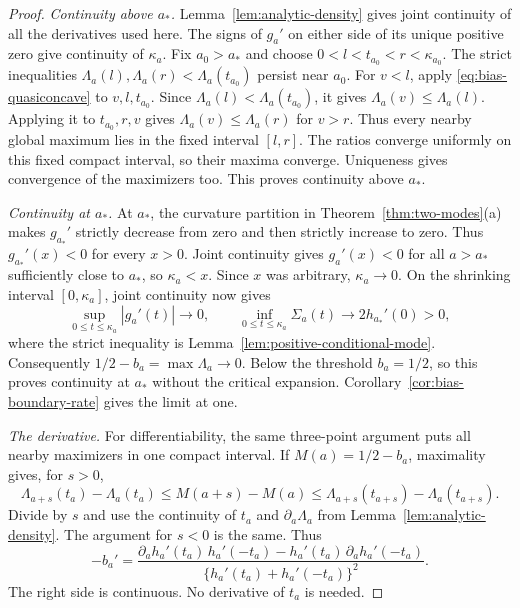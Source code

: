 \begin{proof}
\emph{Continuity above $a_*$.} Lemma~\ref{lem:analytic-density} gives joint continuity of all the
derivatives used here. The signs of $g_a'$ on either side of its
unique positive zero give continuity of $\kappa_a$. Fix $a_0>a_*$
and choose
$0<l<t_{a_0}<r<\kappa_{a_0}$. The strict inequalities
$\Lambda_a(l),\Lambda_a(r)<\Lambda_a(t_{a_0})$ persist near $a_0$.
For $v<l$, apply \eqref{eq:bias-quasiconcave} to
$v,l,t_{a_0}$. Since $\Lambda_a(l)<\Lambda_a(t_{a_0})$, it gives
$\Lambda_a(v)\le \Lambda_a(l)$. Applying it to $t_{a_0},r,v$ gives
$\Lambda_a(v)\le \Lambda_a(r)$ for $v>r$.
Thus every nearby global maximum lies in the fixed interval $[l,r]$.
The ratios converge uniformly on this fixed compact interval,
so their maxima converge. Uniqueness gives convergence of the
maximizers too. This proves continuity above $a_*$.

\emph{Continuity at $a_*$.} At $a_*$, the curvature partition in Theorem~\ref{thm:two-modes}(a)
makes $g_{a_*}'$ strictly decrease from zero and then strictly increase
to zero. Thus $g_{a_*}'(x)<0$ for every $x>0$.
Joint continuity gives $g_a'(x)<0$ for all $a>a_*$ sufficiently close
to $a_*$, so $\kappa_a<x$. Since $x$ was arbitrary, $\kappa_a\to0$.
On the shrinking interval $[0,\kappa_a]$, joint continuity now gives
\[
 \sup_{0\le t\le\kappa_a}|g_a'(t)|\longrightarrow0,\qquad
 \inf_{0\le t\le\kappa_a}\Sigma_a(t)\longrightarrow2h_{a_*}'(0)>0,
\]
where the strict inequality is Lemma~\ref{lem:positive-conditional-mode}.
Consequently $1/2-b_a=\max \Lambda_a\to0$. Below the threshold $b_a=1/2$,
so this proves continuity at $a_*$ without the critical expansion.
Corollary~\ref{cor:bias-boundary-rate} gives the limit at one.

\emph{The derivative.} For differentiability, the same three-point argument puts all nearby
maximizers in one compact interval. If $M(a)=1/2-b_a$, maximality gives,
for $s>0$,
\[
 \Lambda_{a+s}(t_a)-\Lambda_a(t_a)
 \le M(a+s)-M(a)
 \le \Lambda_{a+s}(t_{a+s})-\Lambda_a(t_{a+s}).
\]
Divide by $s$ and use the continuity of $t_a$ and
$\partial_a\Lambda_a$ from Lemma~\ref{lem:analytic-density}. The argument
for $s<0$ is the same. Thus
\begin{equation}\label{eq:bias-envelope-derivative}
 -b_a'=
 \frac{\partial_a h_a'(t_a)\,h_a'(-t_a)
       -h_a'(t_a)\,\partial_a h_a'(-t_a)}
      {\{h_a'(t_a)+h_a'(-t_a)\}^2}.
\end{equation}
The right side is continuous. No derivative of $t_a$ is needed.


\end{proof}

